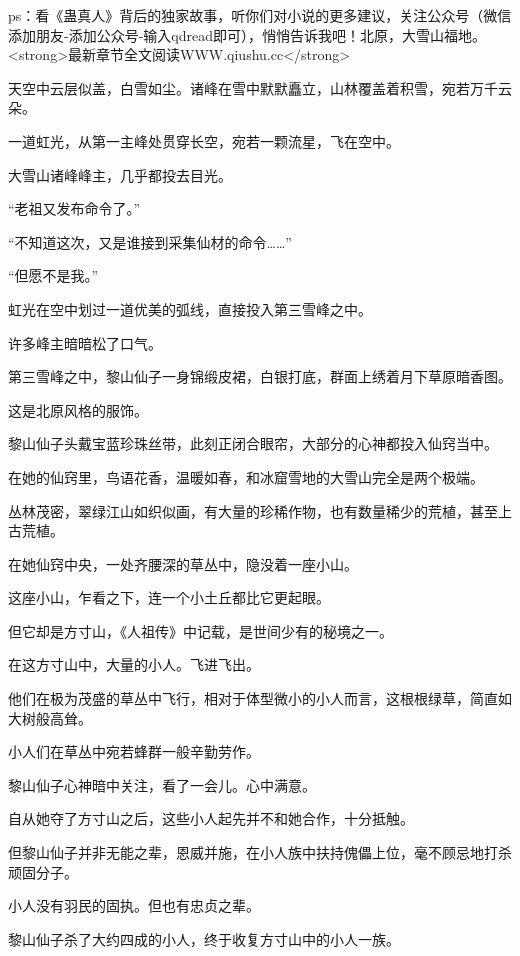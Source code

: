 
\begin{this_body}

ps：看《蛊真人》背后的独家故事，听你们对小说的更多建议，关注公众号（微信添加朋友-添加公众号-输入qdread即可），悄悄告诉我吧！北原，大雪山福地。<strong>最新章节全文阅读WWW.qiushu.cc</strong>

天空中云层似盖，白雪如尘。诸峰在雪中默默矗立，山林覆盖着积雪，宛若万千云朵。

一道虹光，从第一主峰处贯穿长空，宛若一颗流星，飞在空中。

大雪山诸峰峰主，几乎都投去目光。

“老祖又发布命令了。”

“不知道这次，又是谁接到采集仙材的命令……”

“但愿不是我。”

虹光在空中划过一道优美的弧线，直接投入第三雪峰之中。

许多峰主暗暗松了口气。

第三雪峰之中，黎山仙子一身锦缎皮裙，白银打底，群面上绣着月下草原暗香图。

这是北原风格的服饰。

黎山仙子头戴宝蓝珍珠丝带，此刻正闭合眼帘，大部分的心神都投入仙窍当中。

在她的仙窍里，鸟语花香，温暖如春，和冰窟雪地的大雪山完全是两个极端。

丛林茂密，翠绿江山如织似画，有大量的珍稀作物，也有数量稀少的荒植，甚至上古荒植。

在她仙窍中央，一处齐腰深的草丛中，隐没着一座小山。

这座小山，乍看之下，连一个小土丘都比它更起眼。

但它却是方寸山，《人祖传》中记载，是世间少有的秘境之一。

在这方寸山中，大量的小人。飞进飞出。

他们在极为茂盛的草丛中飞行，相对于体型微小的小人而言，这根根绿草，简直如大树般高耸。

小人们在草丛中宛若蜂群一般辛勤劳作。

黎山仙子心神暗中关注，看了一会儿。心中满意。

自从她夺了方寸山之后，这些小人起先并不和她合作，十分抵触。

但黎山仙子并非无能之辈，恩威并施，在小人族中扶持傀儡上位，毫不顾忌地打杀顽固分子。

小人没有羽民的固执。但也有忠贞之辈。

黎山仙子杀了大约四成的小人，终于收复方寸山中的小人一族。


\end{this_body}
